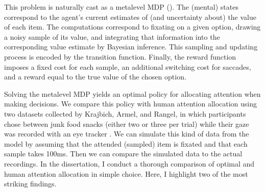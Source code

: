 \documentclass[11pt,a4paperpaper,]{article}
\begin{document}
This problem is naturally cast as a metalevel MDP (). The (mental) states correspond to the agent's current estimates of (and uncertainty about) the value of each item. The computations correspond to fixating on a given option, drawing a noisy sample of its value, and integrating that information into the corresponding value estimate by Bayesian inference. This sampling and updating process is encoded by the transition function. Finally, the reward function imposes a fixed cost for each sample, an additional switching cost for saccades, and a reward equal to the true value of the chosen option.

Solving the metalevel MDP yields an optimal policy for allocating attention when making decisions. We compare this policy with human attention allocation using two datasets collected by Krajbich, Armel, and Rangel, in which participants chose between junk food snacks (either two or three per trial) while their gaze was recorded with an eye tracker \citep{krajbich2010visual,krajbich2011multialternative}. We can simulate this kind of data from the model by assuming that the attended (sampled) item is fixated and that each sample takes 100ms. Then we can compare the simulated data to the actual recordings. In the dissertation, I conduct a thorough comparison of optimal and human attention allocation in simple choice. Here, I highlight two of the most striking findings.

\end{document}

